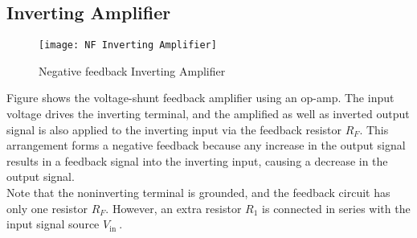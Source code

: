    \subsection{Inverting Amplifier}
   \begin{figure}[H]
   	\centering
   	\texttt{[image: NF Inverting Amplifier]}
   	\caption{Negative feedback Inverting Amplifier}
   	\label{NF Inverting Amplifier}
   \end{figure}
   Figure shows the voltage-shunt feedback amplifier using an op-amp. The input voltage drives the inverting terminal, and the amplified as well as inverted output signal is also applied to the inverting input via the feedback resistor $R_{F}$. This arrangement forms a negative feedback because any increase in the output signal results in a feedback signal into the inverting input, causing a decrease in the output signal.\\
   Note that the noninverting terminal is grounded, and the feedback circuit has only one resistor $R_{F}$. However, an extra resistor $R_{1}$ is connected in series with the input signal source $V_{\text {in }}$.
